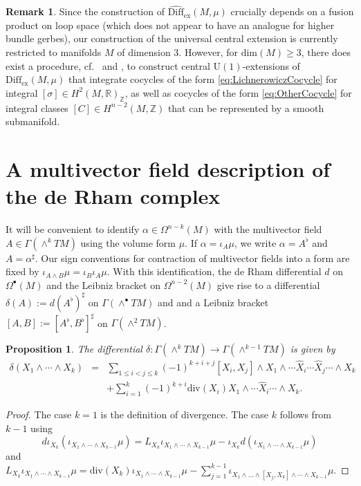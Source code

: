 \documentclass{article}
\newcommand{\ex}{\mathrm{ex}}
\newcommand{\Z}{\mathbb{Z}}
\newcommand{\R}{\mathbb{R}}
\newcommand{\Div}{\mathrm{div}}
\newcommand{\Diff}{\mathrm{Diff}}
\newcommand{\U}{\mathrm{U}}
\newtheorem{Proposition}[Theorem]{Proposition}
\theoremstyle{definition}
\newtheorem{Remark}[Theorem]{Remark}
\begin{document}
\begin{Remark}
Since the construction of $\widehat{\Diff}_{\ex}(M,\mu)$ crucially depends on a fusion product on loop space (which does not appear to have an analogue for higher bundle gerbes), our construction of the universal central extension is currently restricted to manifolds $M$ of dimension 3. 
However, for $\mathrm{dim}(M)\geq 3$, there does exist a procedure, cf.\ \cite{HallerVizman2004} and \cite[Section 5.3.1 and 5.3.2]{DiezJanssensNeebVizman2021}, 
to construct central $\U(1)$-extensions of 
$\Diff_{\ex}(M,\mu)$
that integrate cocycles of the form \eqref{eq:LichnerowiczCocycle} for 
integral $[\sigma] \in H^{2}(M, \R)_{\Z}$,
as well as cocycles of the form 
\eqref{eq:OtherCocycle} 
for integral classes $[C] \in H^{n-2}(M,\Z)$
that can be represented by a smooth submanifold.
\end{Remark}

\appendix


\section{A multivector field description of the de Rham complex}\label{app:multivfcartan}

It will be convenient to identify $\alpha \in \Omega^{n-k}(M)$ with the multivector field $A \in \Gamma(\wedge^kTM)$ using  the volume form $\mu$. If $\alpha = \iota_{A}\mu$, we write $\alpha=A^{\flat}$ and $A=\alpha^{\sharp}$.  Our sign conventions for  contraction of multivector fields into a form are fixed by
$\iota_{A\wedge B}\mu = \iota_{B}\iota_{A}\mu$. With this identification, the de Rham differential $d$ on $\Omega^{\bullet}(M)$ and the Leibniz bracket on $\Omega^{n-2}(M)$  give rise to a differential $\delta(A) := d(A^{\flat})^{\sharp}$ on $\Gamma(\wedge^{\bullet}TM)$ and  and a Leibniz bracket $[A,B] := [A^{\flat}, B^{\flat}]^{\sharp}$ on $\Gamma(\wedge^{2}TM)$. 




\begin{Proposition}
The differential $\delta \colon \Gamma(\wedge^kTM) \rightarrow \Gamma(\wedge^{k-1}TM)$ is given by
\begin{eqnarray*}
\delta (X_1 \wedge \cdots \wedge X_k)
&=& \sum_{1\leq i < j \leq k} (-1)^{k + i + j }[X_i, X_j] \wedge X_1 \wedge \cdots  \hat{X}_i \cdots \hat{X}_j \cdots \wedge X_k\\
& &+ \sum_{i=1}^{k}(-1)^{k + i} \Div(X_i) X_1 \wedge \cdots \hat{X}_i \cdots \wedge X_k.
\end{eqnarray*}
\end{Proposition}
\begin{proof}
The case $k=1$ is the definition of divergence. The case $k$ follows from $k-1$ using \[d \iota_{X_k} (\iota_{X_{1}\wedge \cdots \wedge X_{k-1}}\mu) = 
L_{X_k} \iota_{X_{1} \wedge \cdots \wedge X_{k-1}}\mu - \iota_{X_k} d(\iota_{X_{1} \wedge \cdots \wedge X_{k-1}}\mu)\]
and 
$
L_{X_k} \iota_{X_{1} \wedge \cdots \wedge X_{k-1}}\mu = 
\Div(X_k)\iota_{X_{1} \wedge \cdots \wedge X_{k-1}} \mu - \sum_{j=1}^{k-1}\iota_{X_{1} \wedge \ldots \wedge [X_j, X_k]\wedge  \cdots \wedge X_{k-1}}\mu .
$
\end{proof}
\end{document}

